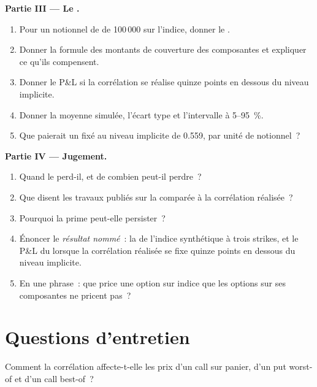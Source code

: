 \begin{problem}
\medskip\noindent\textbf{Partie III --- Le .}
\begin{enumerate}[resume]
\item Pour un notionnel de  de 100\,000 sur l'indice, donner le .
\item Donner la formule des montants de couverture des composantes et expliquer ce qu'ils compensent.
\item Donner le P\&L si la corrélation se réalise quinze points en dessous du niveau implicite.
\item Donner la moyenne simulée, l'écart type et l'intervalle à 5--95~\%.
\item Que paierait un  fixé au niveau implicite de 0.559, par unité de notionnel~?
\end{enumerate}

\medskip\noindent\textbf{Partie IV --- Jugement.}
\begin{enumerate}[resume]
\item Quand le  perd-il, et de combien peut-il perdre~?
\item Que disent les travaux publiés sur la  comparée à la corrélation réalisée~?
\item Pourquoi la prime peut-elle persister~?
\item Énoncer le \emph{résultat nommé}~: la  de l'indice synthétique à trois strikes, et le P\&L du 
lorsque la corrélation réalisée se fixe quinze points en dessous du niveau implicite.
\item En une phrase~: que price une option sur indice que les options sur ses composantes ne pricent pas~?
\end{enumerate}
\end{problem}

\section{Questions d'entretien}

\begin{interviewq}\label{iq:dv:multi-asset-options:1}
Comment la corrélation affecte-t-elle les prix d'un call sur panier, d'un put worst-of et d'un call best-of~?
\end{interviewq}

